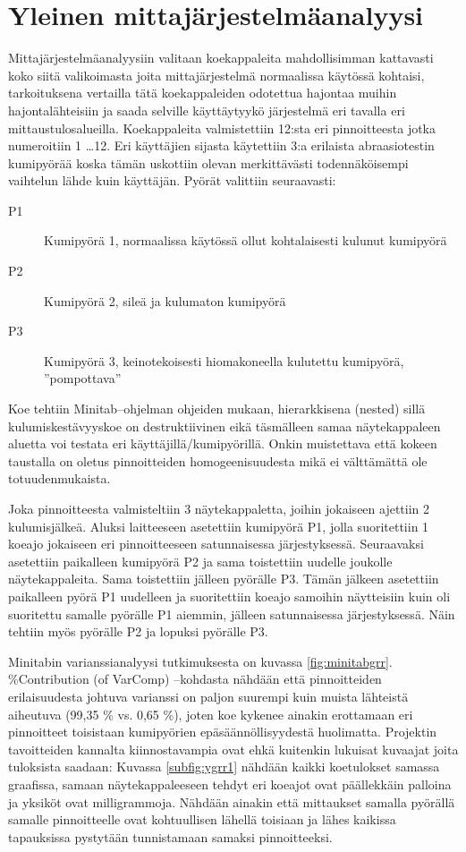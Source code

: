\documentclass[12pt,a4paper,finnish]{tutthesis}
\begin{document}
\section{Yleinen mittajärjestelmäanalyysi}

Mittajärjestelmäanalyysiin valitaan koekappaleita mahdollisimman kattavasti koko siitä valikoimasta joita mittajärjestelmä normaalissa käytössä kohtaisi, tarkoituksena vertailla tätä koekappaleiden odotettua hajontaa muihin hajontalähteisiin ja saada selville käyttäytyykö järjestelmä eri tavalla eri mittaustulosalueilla. Koekappaleita valmistettiin 12:sta eri pinnoitteesta jotka
numeroitiin 1 \ldots 12.
Eri käyttäjien sijasta käytettiin 3:a erilaista abraasiotestin kumipyörää koska tämän
uskottiin olevan merkittävästi todennäköisempi vaihtelun lähde kuin käyttäjän. Pyörät
valittiin seuraavasti:

\begin{description}
  \item[P1] Kumipyörä 1, normaalissa käytössä ollut kohtalaisesti kulunut kumipyörä
  \item[P2] Kumipyörä 2, sileä ja kulumaton kumipyörä
  \item[P3] Kumipyörä 3, keinotekoisesti hiomakoneella kulutettu kumipyörä, ”pompottava”
\end{description}

Koe tehtiin Minitab–ohjelman ohjeiden mukaan, hierarkkisena (nested) sillä kulumiskestävyyskoe on destruktiivinen eikä täsmälleen samaa näytekappaleen aluetta voi testata eri käyttäjillä/kumipyörillä. Onkin muistettava että kokeen taustalla on oletus pinnoitteiden homogeenisuudesta mikä ei välttämättä ole totuudenmukaista.

Joka pinnoitteesta valmisteltiin 3 näytekappaletta, joihin jokaiseen ajettiin 2 kulumisjälkeä. Aluksi laitteeseen asetettiin kumipyörä P1, jolla suoritettiin 1 koeajo jokaiseen eri pinnoitteeseen satunnaisessa järjestyksessä. Seuraavaksi asetettiin paikalleen kumipyörä P2 ja sama toistettiin uudelle joukolle näytekappaleita. Sama toistettiin jälleen pyörälle P3. Tämän jälkeen asetettiin paikalleen pyörä P1 uudelleen ja suoritettiin koeajo samoihin näytteisiin kuin oli suoritettu samalle pyörälle P1 aiemmin, jälleen satunnaisessa järjestyksessä. Näin tehtiin myös pyörälle P2 ja lopuksi pyörälle P3.

Minitabin varianssianalyysi tutkimuksesta on kuvassa \ref{fig:minitabgrr}.
\%Contribution (of VarComp) –kohdasta nähdään että pinnoitteiden erilaisuudesta johtuva varianssi on paljon suurempi kuin muista lähteistä aiheutuva (99,35 \% vs. 0,65 \%), joten koe kykenee ainakin erottamaan eri pinnoitteet toisistaan kumipyörien epäsäännöllisyydestä huolimatta. Projektin tavoitteiden kannalta kiinnostavampia ovat ehkä kuitenkin lukuisat kuvaajat joita tuloksista saadaan: Kuvassa \ref{subfig:ygrr1} nähdään kaikki koetulokset samassa graafissa, samaan näytekappaleeseen tehdyt eri koeajot ovat päällekkäin palloina ja yksiköt ovat milligrammoja.
Nähdään ainakin että mittaukset samalla pyörällä samalle pinnoitteelle ovat kohtuullisen lähellä toisiaan ja lähes kaikissa tapauksissa pystytään tunnistamaan samaksi pinnoitteeksi.
\end{document}
